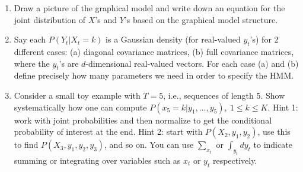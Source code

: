\documentclass[11pt]{article}
\def\ref{\the\refno \global\advance\refno by 1}
\begin{document}
\begin{enumerate}

\item  
Draw a picture of the graphical model and write down an equation for the joint distribution of $X$'s and $Y$'s based on
the graphical model structure.

\item Say each $P(Y_t | X_t = k)$ is a Gaussian density (for real-valued $y_t$'s) for 2 different cases: (a) diagonal covariance matrices, (b)   full covariance matrices, where the $y_t$'s  are $d$-dimensional real-valued vectors. For each case (a) and (b) define precisely how many parameters we need in order to specify the HMM.
\item Consider a small toy example with $T=5$, i.e., sequences of length 5. Show systematically how one can compute $P(x_5 = k| y_1,\ldots,y_5), \ 1 \le k \le K$. Hint 1: work with joint probabilities and then normalize  to get the conditional probability of interest at the end. Hint 2: start with $P(X_2, y_1, y_2)$, use this to find $P(X_3, y_1,y_2, y_3)$, and so on. You can use $\sum_{x_t}$ or $\int_{y_t} dy_t$ to indicate summing or integrating over variables such as $x_t$ or $y_t$ respectively.


 
 \end{enumerate}
 
 
\end{document}

